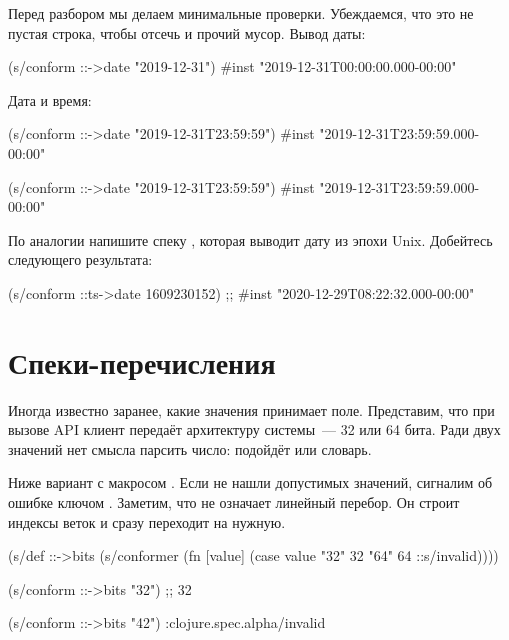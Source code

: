 Перед разбором мы делаем минимальные проверки. Убеждаемся, что это не пустая
строка, чтобы отсечь  и прочий мусор. Вывод даты:


\begin{clojure}
(s/conform ::->date "2019-12-31")
#inst "2019-12-31T00:00:00.000-00:00"
\end{clojure}


\noindent
Дата и время:

\ifnarrow


\begin{clojure}
(s/conform ::->date
           "2019-12-31T23:59:59")
#inst "2019-12-31T23:59:59.000-00:00"
\end{clojure}


\else


\begin{clojure}
(s/conform ::->date "2019-12-31T23:59:59")
#inst "2019-12-31T23:59:59.000-00:00"
\end{clojure}


\fi

По аналогии напишите спеку , которая выводит дату из эпохи
Unix. Добейтесь следующего результата:


\begin{clojure}
(s/conform ::ts->date 1609230152)
;; #inst "2020-12-29T08:22:32.000-00:00"
\end{clojure}


\section{Спеки-перечисления}


Иногда известно заранее, какие значения принимает поле. Представим, что при
вызове API клиент передаёт архитектуру системы~--- 32 или 64 бита. Ради двух
значений нет смысла парсить число: подойдёт  или словарь.

Ниже вариант с макросом . Если не нашли допустимых значений, сигналим
об ошибке ключом . Заметим, что  не означает
линейный перебор. Он строит индексы веток и сразу переходит на нужную.


\ifnarrow


\begin{clojure}
(s/def ::->bits
  (s/conformer
   (fn [value]
     (case value
       "32" 32 "64" 64
       ::s/invalid))))

(s/conform ::->bits "32") ;; 32

(s/conform ::->bits "42")
:clojure.spec.alpha/invalid
\end{clojure}


